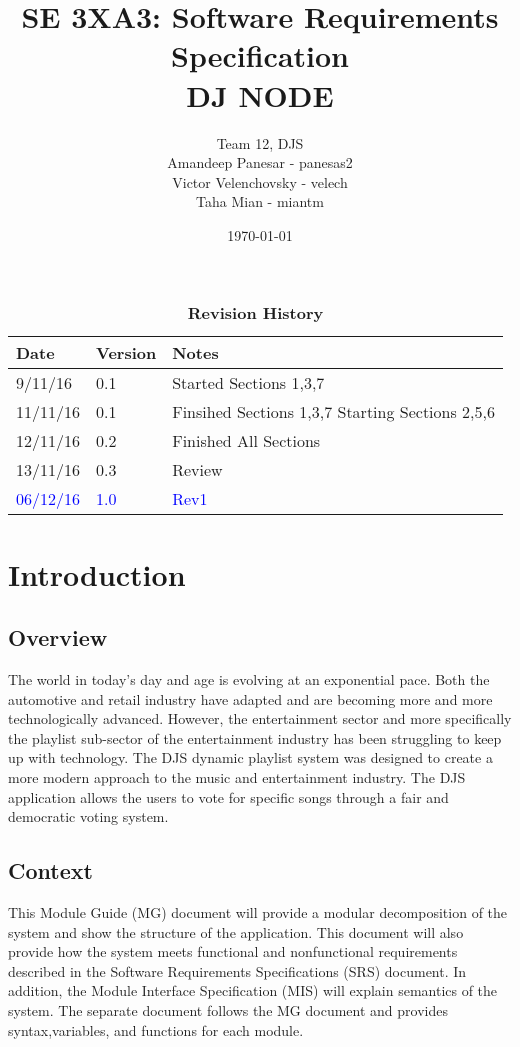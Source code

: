 \documentclass[12pt, titlepage]{article}
\title{SE 3XA3: Software Requirements Specification\\DJ NODE}
\author{Team 12, DJS
		\\ Amandeep Panesar - panesas2
		\\ Victor Velenchovsky - velech
		\\ Taha Mian - miantm
}
\date{\today}
\begin{document}
\maketitle


\tableofcontents
\listoftables
\listoffigures


\begin{table}[h]
\caption{\bf Revision History}
\begin{tabularx}{\textwidth}{p{3cm}p{2cm}X}
\toprule {\bf Date} & {\bf Version} & {\bf Notes}\\
\midrule
9/11/16 & 0.1 & Started Sections 1,3,7\\
11/11/16 & 0.1 & Finsihed Sections 1,3,7 Starting Sections 2,5,6\\
12/11/16 & 0.2 & Finished All Sections\\ 
13/11/16 & 0.3 & Review \\
\textcolor{blue}{06/12/16} & \textcolor{blue}{1.0} &\textcolor{blue}{Rev1}\\
\bottomrule

\end{tabularx}
\end{table}


\clearpage




\section{Introduction}
\subsection{Overview}
The world in today's day and age is evolving at an exponential pace. Both the automotive and retail industry have adapted and are becoming more and more technologically advanced. However, the entertainment sector and more specifically the playlist sub-sector of the entertainment industry has been struggling to keep up with technology. The DJS dynamic playlist system was designed to create a more modern approach to the music and entertainment industry. The DJS application allows the users to vote for specific songs through a fair and democratic voting system.
\subsection{Context}
This Module Guide (MG) document will provide a modular decomposition of the system and show the structure of the application. This document will also provide how the system meets functional and nonfunctional requirements described in the Software Requirements Specifications (SRS) document. In addition, the Module Interface Specification (MIS) will explain semantics of the system. The separate document follows the MG document and provides syntax,variables, and functions for each module.
\end{document}
